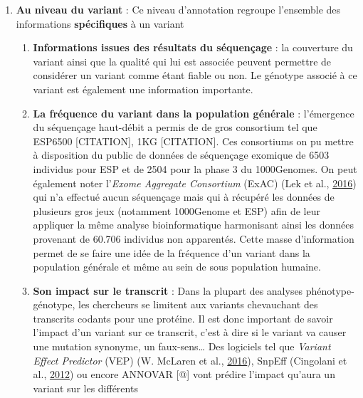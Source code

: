 \documentclass[12pt,twoside]{reedthesis}
\providecommand{\tightlist}{%
  \setlength{\itemsep}{0pt}\setlength{\parskip}{0pt}}
\theoremstyle{definition}
\theoremstyle{definition}
\theoremstyle{remark}
\begin{document}
  \begin{enumerate}
  \def\labelenumi{\arabic{enumi}.}
  \tightlist
  \item
    \textbf{Au niveau du variant} : Ce niveau d'annotation regroupe
    l'ensemble des informations \textbf{spécifiques} à un variant
  
    \begin{enumerate}
    \def\labelenumii{\alph{enumii}.}
    \tightlist
    \item
      \textbf{Informations issues des résultats du séquençage} : la
      couverture du variant ainsi que la qualité qui lui est associée
      peuvent permettre de considérer un variant comme étant fiable ou
      non. Le génotype associé à ce variant est également une information
      importante.\\
    \item
      \textbf{La fréquence du variant dans la population générale} :
      l'émergence du séquençage haut-débit a permis de de gros consortium
      tel que ESP6500 {[}CITATION{]}, 1KG {[}CITATION{]}. Ces consortiums
      on pu mettre à disposition du public de données de séquençage
      exomique de 6503 individus pour ESP et de 2504 pour la phase 3 du
      1000Genomes. On peut également noter l'\emph{Exome Aggregate
      Consortium} (ExAC) (Lek et al.,
      \protect\hyperlink{ref-Lek2016}{2016}) qui n'a effectué aucun
      séquençage mais qui à récupéré les données de plusieurs gros jeux
      (notamment 1000Genome et ESP) afin de leur appliquer la même analyse
      bioinformatique harmonisant ainsi les données provenant de 60.706
      individus non apparentés. Cette masse d'information permet de se
      faire une idée de la fréquence d'un variant dans la population
      générale et même au sein de sous population humaine.\\
    \item
      \textbf{Son impact sur le transcrit} : Dans la plupart des analyses
      phénotype-génotype, les chercheurs se limitent aux variants
      chevauchant des transcrits codants pour une protéine. Il est donc
      important de savoir l'impact d'un variant sur ce transcrit, c'est à
      dire si le variant va causer une mutation synonyme, un
      faux-sens\ldots{} Des logiciels tel que \emph{Variant Effect
      Predictor} (VEP) (W. McLaren et al.,
      \protect\hyperlink{ref-McLaren2016}{2016}), SnpEff (Cingolani et
      al., \protect\hyperlink{ref-Cingolani2012}{2012}) ou encore ANNOVAR
      {[}@{]} vont prédire l'impact qu'aura un variant sur les différents

\end{enumerate}
\end{enumerate}
\end{document}
